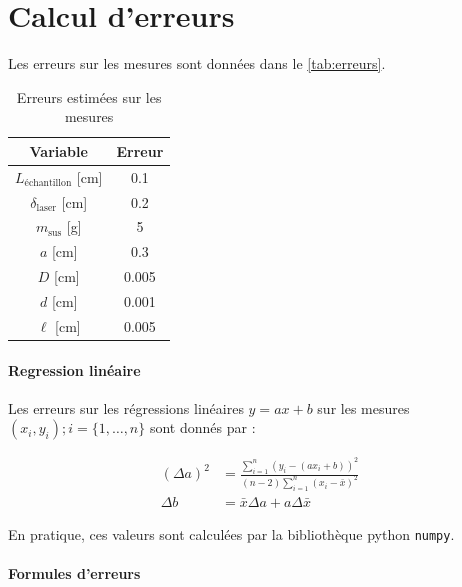 \section{Calcul d'erreurs}
\label{sec:erreurs}

Les erreurs sur les mesures sont données dans le \autoref{tab:erreurs}.

\begin{table}[h]
    \centering
    \begin{tabulary}{\textwidth}{C C}
        \toprule
        Variable & Erreur \\
        \midrule
        \(L_\textrm{échantillon}\) [\si{\centi\meter}] & 0.1 \\
        \(\delta_\textrm{laser}\) [\si{\centi\meter}] & 0.2 \\
        \(m_\textrm{sus}\) [\si{\gram}] & 5 \\
        \(a\) [\si{\centi\metre}] & 0.3 \\
        \(D\) [\si{\centi\metre}] & 0.005 \\
        \(d\) [\si{\centi\meter}] & 0.001 \\
        \(\ell\) [\si{\centi\meter}] & 0.005 \\
        \bottomrule
    \end{tabulary}
    \caption{Erreurs estimées sur les mesures}
    \label{tab:erreurs}
\end{table}

\paragraph*{Regression linéaire}
Les erreurs sur les régressions linéaires \(y = ax + b\) sur les mesures \((x_i, y_i) ; i = \{1, \dots, n\}\) sont donnés par \cite{erreursmesure}:

\begin{equation}
    \label{eq:erreur:fit}
    \begin{aligned}
        (\Delta a)^2 &= \frac{\sum_{i=1}^{n}(y_i - (a x_i + b))^2}{(n-2) \sum_{i=1}^{n}(x_i - \bar{x})^2}\\
        \Delta b &= \bar{x} \Delta a + a \Delta \bar{x}
    \end{aligned}
\end{equation}

En pratique, ces valeurs sont calculées par la bibliothèque python \texttt{numpy}.


\paragraph*{Formules d'erreurs}

